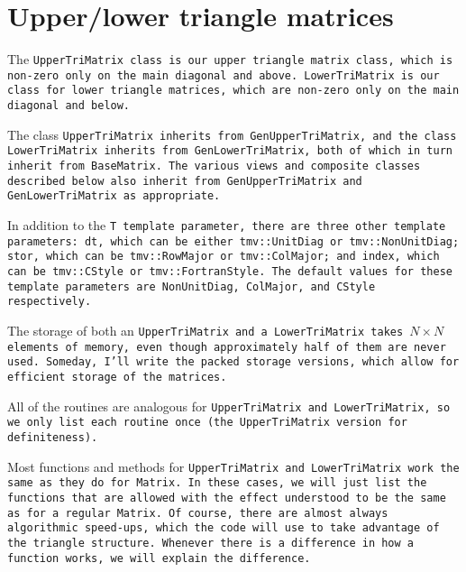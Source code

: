 
\section{Upper/lower triangle matrices}
\label{TriMatrix}

The \tt{UpperTriMatrix} class is our upper triangle matrix class, which is non-zero
only on the main diagonal and above.  \tt{LowerTriMatrix} is our class for lower
triangle matrices, which are non-zero only on the main diagonal and below.

The class \tt{UpperTriMatrix} inherits from \tt{GenUpperTriMatrix}, 
and the class \tt{LowerTriMatrix}
inherits from \tt{GenLowerTriMatrix}, both of
which in turn inherit from \tt{BaseMatrix}.  
The various views and composite classes described below
also inherit from \tt{GenUpperTriMatrix} and \tt{GenLowerTriMatrix} 
as appropriate.

In addition to the \tt{T} template parameter, there are three other template 
parameters:
\tt{dt}, which can be either \tt{tmv::UnitDiag} or \tt{tmv::NonUnitDiag};
\tt{stor}, which can be \tt{tmv::RowMajor} or \tt{tmv::ColMajor};
and \tt{index}, which can be \tt{tmv::CStyle} or \tt{tmv::FortranStyle}.
The default values for these template parameters are 
\tt{NonUnitDiag}, \tt{ColMajor}, and \tt{CStyle} respectively.

The storage of both an \tt{UpperTriMatrix} and a \tt{LowerTriMatrix} takes
$N \times N$ elements of memory, even though approximately half of them 
are never used.  Someday, I'll write the packed storage versions, which allow for
efficient storage of the matrices.

All of the routines are analogous for \tt{UpperTriMatrix} and 
\tt{LowerTriMatrix}, so we only list each routine once 
(the \tt{UpperTriMatrix} version for
definiteness).  

Most functions and methods for \tt{UpperTriMatrix} and \tt{LowerTriMatrix}
work the same as they do for \tt{Matrix}.
In these cases, we will just list the functions that are allowed with the
effect understood to be the same as for a regular \tt{Matrix}.  Of course, there are 
almost always algorithmic speed-ups, which the code will use to take advantage of the 
triangle structure.
Whenever there is a difference in how a function works,
we will explain the difference.

